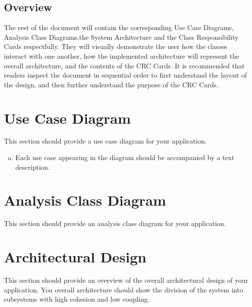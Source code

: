 \documentclass[]{article}
\begin{document}
\subsection{Overview}
\label{sub:overview}
	The rest of the document will contain the corresponding Use Case Diagrams, Analysis Class Diagrams,the System Architecture and the Class Responsibility Cards respectfully. They will visually demonstrate the user how the classes interact with one another, how the implemented architecture will represent the overall architecture, and the contents of the CRC Cards. It is recommended that readers inspect the document in sequential order to first understand the layout of the design, and then further understand the purpose of the CRC Cards.




\section{Use Case Diagram}
\label{sec:use_case_diagram}
This section should provide a use case diagram for your application. 
\begin{enumerate}[a)]
	\item Each use case appearing in the diagram should be accompanied by a text description. 
\end{enumerate}

\section{Analysis Class Diagram}
\label{sec:analysis_class_diagram}
This section should provide an analysis class diagram for your application.


\section{Architectural Design}
\label{sec:architectural_design}
This section should provide an overview of the overall architectural design of your application. You overall architecture should show the division of the system into subsystems with high cohesion and low coupling.
\end{document}
